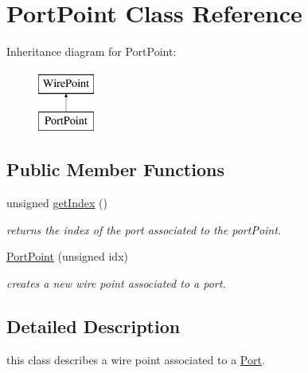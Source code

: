 \hypertarget{class_open_chams_1_1_port_point}{\section{Port\-Point Class Reference}
\label{class_open_chams_1_1_port_point}
}
Inheritance diagram for Port\-Point\-:\begin{figure}[H]
\begin{center}
\leavevmode
\includegraphics[height=2.000000cm]{class_open_chams_1_1_port_point}
\end{center}
\end{figure}
\subsection*{Public Member Functions}
\begin{DoxyCompactItemize}
\item 
\hypertarget{class_open_chams_1_1_port_point_ab4018980dcd1fed5208e7a72846cd815}{unsigned \hyperlink{class_open_chams_1_1_port_point_ab4018980dcd1fed5208e7a72846cd815}{get\-Index} ()}\label{class_open_chams_1_1_port_point_ab4018980dcd1fed5208e7a72846cd815}

\begin{DoxyCompactList}\small\item\em returns the index of the port associated to the port\-Point. \end{DoxyCompactList}\item 
\hyperlink{class_open_chams_1_1_port_point_aaa11e5ede2581539ec666941e1c86fc3}{Port\-Point} (unsigned idx)
\begin{DoxyCompactList}\small\item\em creates a new wire point associated to a port. \end{DoxyCompactList}\end{DoxyCompactItemize}


\subsection{Detailed Description}
this class describes a wire point associated to a \hyperlink{class_open_chams_1_1_port}{Port}. 

